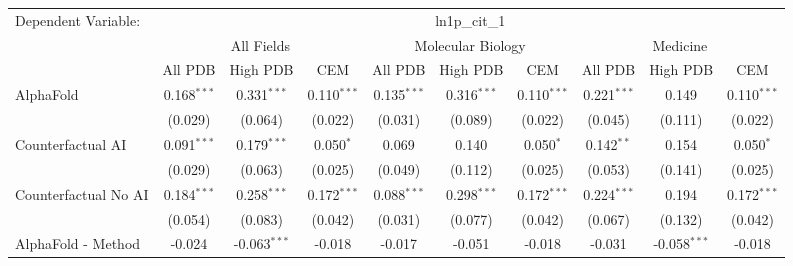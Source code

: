 \begingroup
\centering
\begin{tabular}{lccccccccc}
   \tabularnewline \midrule \midrule
   Dependent Variable: & \multicolumn{9}{c}{ln1p\_cit\_1}\\
 & \multicolumn{3}{c}{All Fields} & \multicolumn{3}{c}{Molecular Biology} & \multicolumn{3}{c}{Medicine} \\
\cmidrule(lr){2-7} \cmidrule(lr){5-10} \cmidrule(lr){8-7}
 & \multicolumn{1}{c}{All PDB} & \multicolumn{1}{c}{High PDB} & \multicolumn{1}{c}{CEM} & \multicolumn{1}{c}{All PDB} & \multicolumn{1}{c}{High PDB} & \multicolumn{1}{c}{CEM} & \multicolumn{1}{c}{All PDB} & \multicolumn{1}{c}{High PDB} & \multicolumn{1}{c}{CEM} \\
\cmidrule(lr){2-3} \cmidrule(lr){3-4} \cmidrule(lr){4-5} \cmidrule(lr){5-6} \cmidrule(lr){6-7} \cmidrule(lr){7-8} \cmidrule(lr){8-9} \cmidrule(lr){9-10} \cmidrule(lr){10-3}
   AlphaFold                                                   & 0.168$^{***}$ & 0.331$^{***}$  & 0.110$^{***}$ & 0.135$^{***}$ & 0.316$^{***}$  & 0.110$^{***}$ & 0.221$^{***}$ & 0.149          & 0.110$^{***}$\\   
                                                               & (0.029)       & (0.064)        & (0.022)       & (0.031)       & (0.089)        & (0.022)       & (0.045)       & (0.111)        & (0.022)\\   
   Counterfactual AI                                           & 0.091$^{***}$ & 0.179$^{***}$  & 0.050$^{*}$   & 0.069         & 0.140          & 0.050$^{*}$   & 0.142$^{**}$  & 0.154          & 0.050$^{*}$\\   
                                                               & (0.029)       & (0.063)        & (0.025)       & (0.049)       & (0.112)        & (0.025)       & (0.053)       & (0.141)        & (0.025)\\   
   Counterfactual No AI                                        & 0.184$^{***}$ & 0.258$^{***}$  & 0.172$^{***}$ & 0.088$^{***}$ & 0.298$^{***}$  & 0.172$^{***}$ & 0.224$^{***}$ & 0.194          & 0.172$^{***}$\\   
                                                               & (0.054)       & (0.083)        & (0.042)       & (0.031)       & (0.077)        & (0.042)       & (0.067)       & (0.132)        & (0.042)\\   
   AlphaFold - Method                                          & -0.024        & -0.063$^{***}$ & -0.018        & -0.017        & -0.051         & -0.018        & -0.031        & -0.058$^{***}$ & -0.018\\   

\end{tabular}
